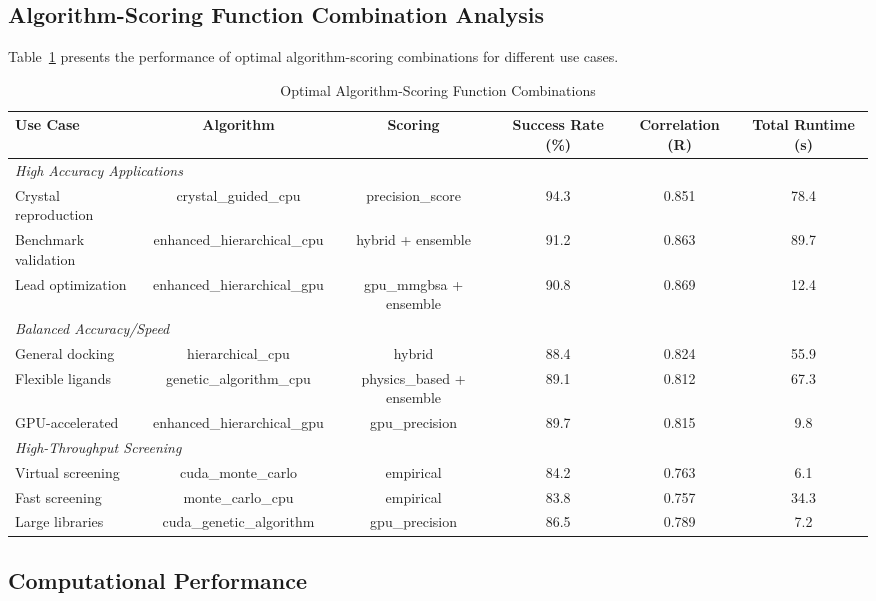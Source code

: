 \documentclass[11pt,a4paper]{article}
\begin{document}
\subsection{Algorithm-Scoring Function Combination Analysis}

Table~\ref{tab:algorithm_scoring_combinations} presents the performance of optimal algorithm-scoring combinations for different use cases.

\begin{table}[H]
\centering
\caption{Optimal Algorithm-Scoring Function Combinations}
\begin{tabular}{lccccc}
\toprule
\textbf{Use Case} & \textbf{Algorithm} & \textbf{Scoring} & \textbf{Success Rate (\%)} & \textbf{Correlation (R)} & \textbf{Total Runtime (s)} \\
\midrule
\multicolumn{6}{l}{\textit{High Accuracy Applications}} \\
Crystal reproduction & crystal\_guided\_cpu & precision\_score & 94.3 & 0.851 & 78.4 \\
Benchmark validation & enhanced\_hierarchical\_cpu & hybrid + ensemble & 91.2 & 0.863 & 89.7 \\
Lead optimization & enhanced\_hierarchical\_gpu & gpu\_mmgbsa + ensemble & 90.8 & 0.869 & 12.4 \\
\midrule
\multicolumn{6}{l}{\textit{Balanced Accuracy/Speed}} \\
General docking & hierarchical\_cpu & hybrid & 88.4 & 0.824 & 55.9 \\
Flexible ligands & genetic\_algorithm\_cpu & physics\_based + ensemble & 89.1 & 0.812 & 67.3 \\
GPU-accelerated & enhanced\_hierarchical\_gpu & gpu\_precision & 89.7 & 0.815 & 9.8 \\
\midrule
\multicolumn{6}{l}{\textit{High-Throughput Screening}} \\
Virtual screening & cuda\_monte\_carlo & empirical & 84.2 & 0.763 & 6.1 \\
Fast screening & monte\_carlo\_cpu & empirical & 83.8 & 0.757 & 34.3 \\
Large libraries & cuda\_genetic\_algorithm & gpu\_precision & 86.5 & 0.789 & 7.2 \\
\bottomrule
\end{tabular}
\label{tab:algorithm_scoring_combinations}
\end{table}

\subsection{Computational Performance}
\end{document}

